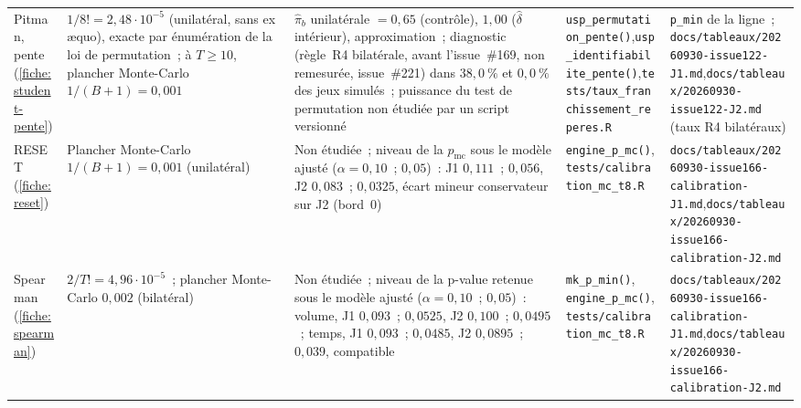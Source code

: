 \documentclass[a4paper,11pt]{article}
\newcommand{\code}[1]{\texttt{\small #1}}
\begin{document}
\begin{landscape}
\begin{center}
\begin{longtable}{@{}>{\raggedright\arraybackslash}p{2.5cm}>{\raggedright\arraybackslash}p{3.6cm}>{\raggedright\arraybackslash}p{4.0cm}>{\raggedright\arraybackslash}p{6.7cm}>{\raggedright\arraybackslash}p{7.2cm}@{}}
Pitman, pente (\ref{fiche:student-pente}) & $1/8! = 2{,}48\cdot 10^{-5}$ (unilatéral, sans ex \ae quo), exacte par énumération de la loi de permutation~; à $T \ge 10$, plancher Monte-Carlo $1/(B+1) = 0{,}001$ & $\hat\pi_b$ unilatérale $= 0{,}65$ (contrôle), $1{,}00$ ($\hat\delta$ intérieur), approximation~; diagnostic (règle~R4 bilatérale, avant l'issue~\#169, non remesurée, issue~\#221) dans $38{,}0~\%$ et $0{,}0~\%$ des jeux simulés~; puissance du test de permutation non étudiée par un script versionné & \code{usp\_permutation\_pente()},\newline \code{usp\_identifiabilite\_pente()},\newline \code{tests/taux\_franchissement\_reperes.R} & \code{p\_min} de la ligne~; \code{docs/tableaux/}\newline \code{20260930-issue122-J1.md},\newline \code{docs/tableaux/}\newline \code{20260930-issue122-J2.md} (taux R4 bilatéraux) \\
RESET (\ref{fiche:reset}) & Plancher Monte-Carlo $1/(B+1) = 0{,}001$ (unilatéral) & Non étudiée~; niveau de la $p_{\mathrm{mc}}$ sous le modèle ajusté ($\alpha = 0{,}10$~; $0{,}05$)~: J1 $0{,}111$~; $0{,}056$, J2 $0{,}083$~; $0{,}0325$, écart mineur conservateur sur J2 (bord~0) & \code{engine\_p\_mc()},\newline \code{tests/calibration\_mc\_t8.R} & \code{docs/tableaux/}\newline \code{20260930-issue166-calibration-J1.md},\newline \code{docs/tableaux/}\newline \code{20260930-issue166-calibration-J2.md} \\
Spearman (\ref{fiche:spearman}) & $2/T! = 4{,}96\cdot 10^{-5}$~; plancher Monte-Carlo $0{,}002$ (bilatéral) & Non étudiée~; niveau de la p-value retenue sous le modèle ajusté ($\alpha = 0{,}10$~; $0{,}05$)~: volume, J1 $0{,}093$~; $0{,}0525$, J2 $0{,}100$~; $0{,}0495$~; temps, J1 $0{,}093$~; $0{,}0485$, J2 $0{,}0895$~; $0{,}039$, compatible & \code{mk\_p\_min()}, \code{engine\_p\_mc()},\newline \code{tests/calibration\_mc\_t8.R} & \code{docs/tableaux/}\newline \code{20260930-issue166-calibration-J1.md},\newline \code{docs/tableaux/}\newline \code{20260930-issue166-calibration-J2.md} \\

\end{longtable}
\end{center}
\end{landscape}
\end{document}
